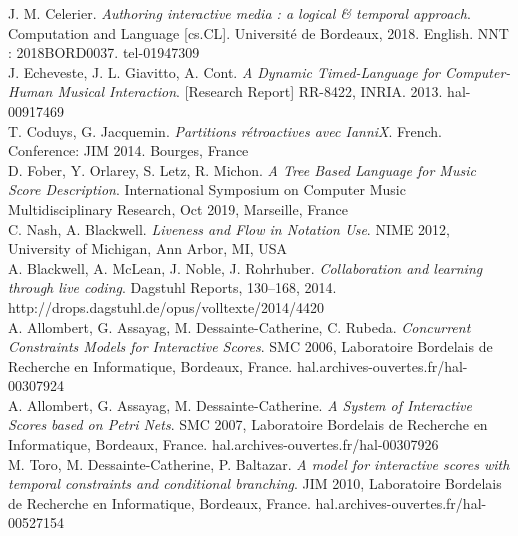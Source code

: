 \documentclass[journal,onecolumn]{IEEEtran}
\begin{document}
\begin{thebibliography}{1}

J. M. Celerier. \emph{Authoring interactive media : a logical \& temporal approach}. Computation and Language [cs.CL]. Université de Bordeaux, 2018. English. NNT : 2018BORD0037. tel-01947309 \\

J. Echeveste, J. L. Giavitto, A. Cont. \emph{A Dynamic Timed-Language for Computer-Human Musical Interaction}. [Research Report] RR-8422, INRIA. 2013. hal-00917469 \\

T. Coduys, G. Jacquemin. \emph{Partitions rétroactives
avec IanniX}. French. Conference: JIM 2014. Bourges, France \\

D. Fober, Y. Orlarey, S. Letz, R. Michon. \emph{A Tree Based Language for Music Score Description}. International Symposium on Computer Music Multidisciplinary Research, Oct 2019, Marseille, France  \\

C. Nash, A. Blackwell. \emph{Liveness and Flow in Notation Use}. NIME 2012, University of Michigan, Ann Arbor, MI, USA \\

A. Blackwell, A. McLean, J. Noble, J. Rohrhuber. \emph{Collaboration and learning through live coding}. Dagstuhl Reports, 130--168, 2014. http://drops.dagstuhl.de/opus/volltexte/2014/4420 \\

A. Allombert, G. Assayag, M. Dessainte-Catherine, C. Rubeda. \emph{Concurrent Constraints Models for Interactive Scores}. SMC 2006, Laboratoire Bordelais de Recherche en Informatique, Bordeaux, France. hal.archives-ouvertes.fr/hal-00307924 \\

A. Allombert, G. Assayag, M. Dessainte-Catherine. \emph{A System of Interactive Scores based on Petri Nets}. SMC 2007, Laboratoire Bordelais de Recherche en Informatique, Bordeaux, France. hal.archives-ouvertes.fr/hal-00307926 \\

M. Toro, M. Dessainte-Catherine, P. Baltazar. \emph{A model for interactive scores with temporal constraints and conditional branching}. JIM 2010, Laboratoire Bordelais de Recherche en Informatique, Bordeaux, France. hal.archives-ouvertes.fr/hal-00527154 \\


\end{thebibliography}
\end{document}
